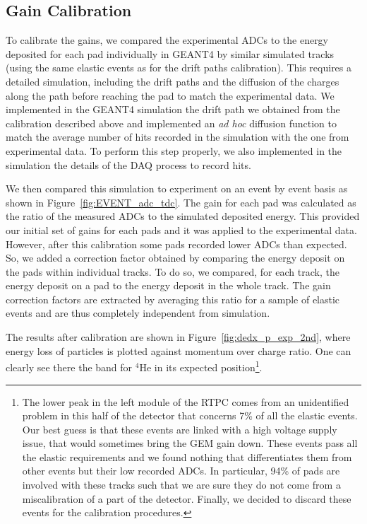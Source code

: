 \documentclass[preprint,5p]{elsarticle}
\begin{document}
\subsection{Gain Calibration}

To calibrate the gains, we compared the experimental ADCs to the energy 
deposited for each pad individually in GEANT4 by similar simulated tracks 
(using the same elastic events as for the drift paths calibration). This 
requires a detailed simulation, including the drift paths and the diffusion of 
the charges along the path before reaching the pad to 
match the experimental data. We implemented in the GEANT4 simulation the
drift path we obtained from the calibration described above and implemented an {\it ad 
hoc} diffusion function to match the average number of hits recorded in the simulation with
the one from experimental data. To perform this step properly, we also implemented in
the simulation the details of the DAQ process to record hits. 

We then compared this simulation to experiment on an event by event basis as 
shown in Figure~\ref{fig:EVENT_adc_tdc}. The gain for each pad was calculated 
as the ratio of the measured ADCs to the simulated deposited energy. This 
provided our initial set of gains for each pads and it was applied to the 
experimental data. However, after this calibration some pads recorded lower ADCs 
than expected. So, we added a correction factor obtained by comparing  
the energy deposit on the pads within individual tracks. To do so, we compared, for 
each track, the energy deposit on a pad to the energy deposit in the whole track. 
The gain correction factors are extracted by averaging this ratio for a sample 
of elastic events and are thus completely independent from simulation. 

The results after calibration are shown in Figure~\ref{fig:dedx_p_exp_2nd}, where energy 
loss of particles is plotted against momentum over charge ratio. One can 
clearly see there the band for $^4$He in its expected position\footnote{The lower peak 
   in the left module of the RTPC comes from an unidentified problem in this half 
   of the detector that concerns 7\% of all the elastic events. 
   Our best guess is that these events are linked with a high voltage supply 
   issue, that would sometimes bring the GEM gain down. These events pass all 
   the elastic requirements and we found nothing that differentiates them from 
   other events but their low recorded ADCs. In particular, 94\% of pads
   are involved with these tracks such that we are sure they do not come from 
   a miscalibration of a part of the detector. Finally, we decided to discard
   these events for the calibration procedures.}.
\end{document}
